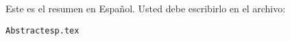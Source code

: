 ﻿%

\bigskip   %

Este es el resumen en Espa\~nol. Usted debe escribirlo en el archivo: 

\vspace{.5in}

\begin{center}
	\begin{verbatim}Abstractesp.tex
	\end{verbatim}
\end{center}

